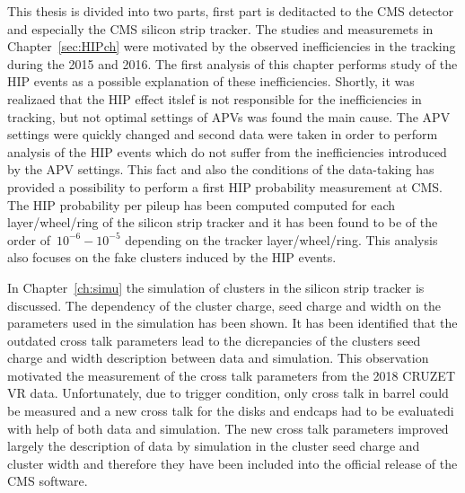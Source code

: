 

This thesis is divided into two parts, first part is deditacted to the CMS detector and especially the CMS silicon strip tracker. The studies and measuremets in Chapter~\ref{sec:HIPch} were motivated by the observed inefficiencies in the tracking during the 2015 and 2016. The first analysis of this chapter performs study of the HIP events as a possible explanation of these inefficiencies. Shortly, it was realizaed that the HIP effect itslef is not responsible for the inefficiencies in tracking, but not optimal settings of APVs was found the main cause.  The APV settings were quickly changed and second data were taken in order to perform analysis of the HIP events which do not suffer from the inefficiencies introduced by the APV settings. This fact and also the conditions of the data-taking has provided a possibility to perform a first HIP probability measurement at CMS. The HIP probability per pileup has been computed computed for each layer/wheel/ring of the silicon strip tracker and it has been found to be of the order of~$10^{-6}-10^{-5}$ depending on the tracker layer/wheel/ring. This analysis also focuses on the fake clusters induced by the HIP events. 

In Chapter~\ref{ch:simu} the simulation of clusters in the silicon strip tracker is discussed. The dependency of the cluster charge, seed charge and width on the parameters used in the simulation has been shown. It has been identified that the outdated cross talk parameters lead to the dicrepancies of the clusters seed charge and width description between data and simulation. This observation motivated the measurement of the cross talk parameters from the 2018 CRUZET VR data. Unfortunately, due to trigger condition, only cross talk in barrel could be measured and a new cross talk for the disks and endcaps had to be evaluatedi with help of both data and simulation. The new cross talk parameters improved largely the description of data by simulation in the cluster seed charge and cluster width and therefore they have been included into the official release of the CMS software.

